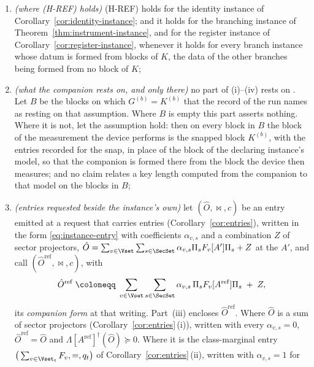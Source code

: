 \begin{corollary}
\begin{enumerate}[label=(\roman*),leftmargin=3.0em]
  $R^{(s)}_{v,il}$ is the radius of its element $v$ at that entry, and
  radius zero on every ;
\item \emph{(where (H-REF) holds)} (H-REF) holds for the identity instance of
  Corollary~\ref{cor:identity-instance}; and it holds for the branching
  instance of Theorem~\ref{thm:instrument-instance}, and for the register
  instance of Corollary~\ref{cor:register-instance}, whenever it holds for
  every branch instance whose datum is formed from blocks of $K$, the data of
  the other branches being formed from no block of $K$;
\item \emph{(what the companion rests on, and only there)} no part of
  (i)--(iv) rests on . Let $B$ be
  the blocks on which $G^{(b)}=K^{(b)}$ that the record of the run names as
  resting on that assumption. Where $B$ is empty this part asserts nothing.
  Where it is not, let the assumption hold: then on every block in $B$ the
  block of the measurement the device performs is the snapped block
  $K^{(b)}$, with the entries recorded for the snap, in place of the block
  of the declaring instance's model, so that the companion is formed there
  from the block the device then measures; and no claim relates a key length
  computed from the companion to that model on the blocks in $B$;
\item \emph{(entries requested beside the instance's own)} let
  $(\hat O,\bowtie,c)$ be an entry emitted at a request that carries entries
  (Corollary~\ref{cor:entries}), written in the form
  \eqref{eq:instance-entry} with coefficients $\alpha_{v,s}$ and a
  combination $Z$ of sector projectors,
  $\hat O=\sum_{v\in\Vset}\sum_{s\in\SecSet}\alpha_{v,s}\Pi_sF_v[A']\Pi_s+Z$
  at the  $A'$, and call
  $(\hat O^{\mathrm{ref}},\bowtie,c)$, with
  \begin{equation}\label{eq:companion-form}
    \hat O^{\mathrm{ref}}\;\coloneqq\;\sum_{v\in\Vset}\sum_{s\in\SecSet}
      \alpha_{v,s}\,\Pi_sF_v[A^{\mathrm{ref}}]\Pi_s\;+\;Z ,
  \end{equation}
  its \emph{companion form} at that writing. Part~(iii) encloses
  $\hat O^{\mathrm{ref}}$. Where $\hat O$ is a sum of sector projectors
  (Corollary~\ref{cor:entries}\,(i)), written with every $\alpha_{v,s}=0$,
  $\hat O^{\mathrm{ref}}=\hat O$ and
  $\Lambda[A^{\mathrm{ref}}]^{\dagger}(\hat O)\succeq0$. Where it is the
  class-marginal entry $\big(\sum_{v\in\Vset_t}F_v,=,q_t\big)$ of
  Corollary~\ref{cor:entries}\,(ii), written with $\alpha_{v,s}=1$ for

\end{enumerate}
\end{corollary}
